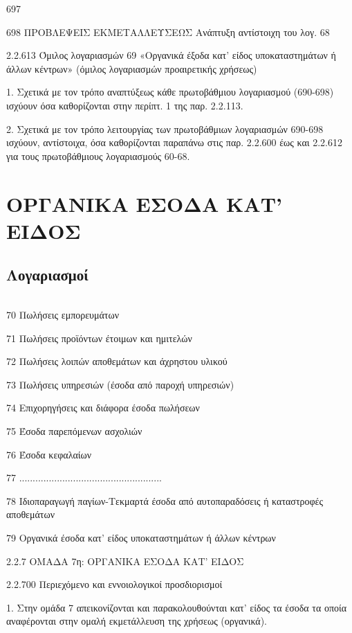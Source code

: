 \documentclass[A4,10pt,greek]{book}
\begin{document}
        697

        698    ΠΡΟΒΛΕΨΕΙΣ ΕΚΜΕΤΑΛΛΕΥΣΕΩΣ
                  Ανάπτυξη αντίστοιχη του λογ. 68

2.2.613 Όμιλος λογαριασμών 69 «Οργανικά έξοδα κατ' είδος υποκαταστημάτων ή άλλων κέντρων» (όμιλος λογαριασμών προαιρετικής χρήσεως)

1. Σχετικά με τον τρόπο αναπτύξεως κάθε πρωτοβάθμιου λογαριασμού (690-698) ισχύουν όσα καθορίζονται στην περίπτ. 1 της παρ. 2.2.113.

2. Σχετικά με τον τρόπο λειτουργίας των πρωτοβάθμιων λογαριασμών 690-698 ισχύουν, αντίστοιχα, όσα καθορίζονται παραπάνω στις παρ. 2.2.600 έως και 2.2.612 για τους πρωτοβάθμιους λογαριασμούς 60-68.

\chapter{ΟΡΓΑΝΙΚΑ ΕΣΟΔΑ ΚΑΤ' ΕΙΔΟΣ}

\section{Λογαριασμοί}

\begin{tabularx}{\linewidth}{lX}

\end{tabularx}

70 Πωλήσεις εμπορευμάτων

71 Πωλήσεις προϊόντων έτοιμων και ημιτελών

72 Πωλήσεις λοιπών αποθεμάτων και άχρηστου υλικού

73 Πωλήσεις υπηρεσιών (έσοδα από παροχή υπηρεσιών)

74 Επιχορηγήσεις και διάφορα έσοδα πωλήσεων

75 Έσοδα παρεπόμενων ασχολιών

76 Έσοδα κεφαλαίων

77 .....................................................

78 Ιδιοπαραγωγή παγίων-Τεκμαρτά έσοδα από αυτοπαραδόσεις ή
     καταστροφές αποθεμάτων

79 Οργανικά έσοδα κατ' είδος υποκαταστημάτων ή άλλων κέντρων

 

2.2.7 ΟΜΑΔΑ 7η: ΟΡΓΑΝΙΚΑ ΕΣΟΔΑ ΚΑΤ' ΕΙΔΟΣ

2.2.700 Περιεχόμενο και εννοιολογικοί προσδιορισμοί

1. Στην ομάδα 7 απεικονίζονται και παρακολουθούνται κατ' είδος τα έσοδα τα οποία αναφέρονται στην ομαλή εκμετάλλευση της χρήσεως (οργανικά).
\end{document}
